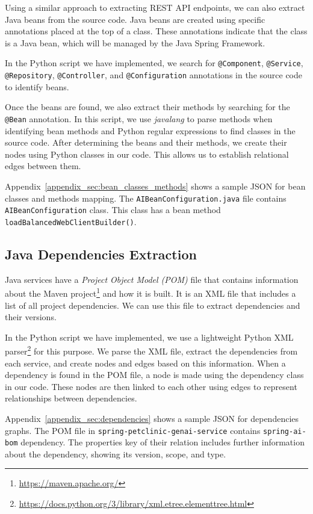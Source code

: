 Using a similar approach to extracting REST API endpoints, we can also extract Java beans from the source code. Java beans are created using specific annotations placed at the top of a class. These annotations indicate that the class is a Java bean, which will be managed by the Java Spring Framework.

In the Python script we have implemented, we search for \texttt{@Component}, \texttt{@Service}, \texttt{@Repository}, \texttt{@Controller}, and \texttt{@Configuration} annotations in the source code to identify beans.

Once the beans are found, we also extract their methods by searching for the \texttt{@Bean} annotation. In this script, we use \textit{javalang} to parse methods when identifying bean methods and Python regular expressions to find classes in the source code. After determining the beans and their methods, we create their nodes using Python classes in our code. This allows us to establish relational edges between them.

Appendix~\ref{appendix_sec:bean_classes_methods} shows a sample JSON for bean classes and methods mapping. The \texttt{AIBeanConfiguration.java} file contains \texttt{AIBeanConfiguration} class. This class has a bean method \texttt{loadBalancedWebClientBuilder()}.

\subsection{Java Dependencies Extraction}

Java services have a \textit{Project Object Model (POM)} file that contains information about the Maven project\footnote{\url{https://maven.apache.org/}} and how it is built. It is an XML file that includes a list of all project dependencies. We can use this file to extract dependencies and their versions.

In the Python script we have implemented, we use a lightweight Python XML parser\footnote{\url{https://docs.python.org/3/library/xml.etree.elementtree.html}} for this purpose. We parse the XML file, extract the dependencies from each service, and create nodes and edges based on this information. When a dependency is found in the POM file, a node is made using the dependency class in our code. These nodes are then linked to each other using edges to represent relationships between dependencies.

\sloppy
Appendix~\ref{appendix_sec:dependencies} shows a sample JSON for dependencies graphs. The POM file in \texttt{spring-petclinic-genai-service} contains \texttt{spring-ai-bom} dependency. The properties key of their relation includes further information about the dependency, showing its version, scope, and type.

